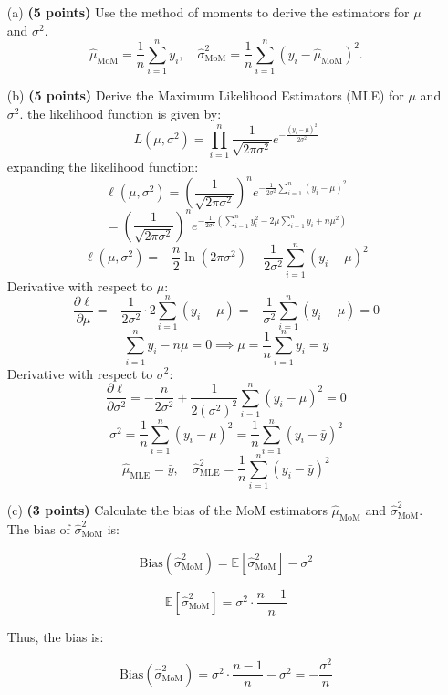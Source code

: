 \documentclass{article}
\begin{document}
\begin{enumerate}
    \item[(a)] \textbf{(5 points)} Use the method of moments to derive the estimators for \(\mu\) and \(\sigma^2\).
    \[
    \hat{\mu}_{\text{MoM}} = \frac{1}{n} \sum_{i=1}^{n} y_i, \quad \hat{\sigma}^2_{\text{MoM}} = \frac{1}{n} \sum_{i=1}^{n} (y_i - \hat{\mu}_{\text{MoM}})^2.
    \]
    
     \item[(b)] \textbf{(5 points)} Derive the Maximum Likelihood Estimators (MLE) for \(\mu\) and \(\sigma^2\).
    the likelihood function is given by:
    \[
    L(\mu, \sigma^2) = \prod_{i=1}^{n} \frac{1}{\sqrt{2\pi\sigma^2}} e^{-\frac{(y_i - \mu)^2}{2\sigma^2}}
    \]
    expanding the likelihood function:
    \[
    \ell(\mu, \sigma^2) = \left( \frac{1}{\sqrt{2\pi\sigma^2}} \right)^n e^{-\frac{1}{2\sigma^2} \sum_{i=1}^{n} (y_i - \mu)^2}
    \]
    \[
    = \left( \frac{1}{\sqrt{2\pi\sigma^2}} \right)^n e^{-\frac{1}{2\sigma^2} \left( \sum_{i=1}^{n} y_i^2 - 2\mu \sum_{i=1}^{n} y_i + n\mu^2 \right)}
    \]
    \[
    \ell(\mu, \sigma^2) = -\frac{n}{2} \ln(2\pi\sigma^2) - \frac{1}{2\sigma^2} \sum_{i=1}^n (y_i - \mu)^2
    \]
    Derivative with respect to \( \mu \):
    \[
    \frac{\partial \ell}{\partial \mu} = -\frac{1}{2\sigma^2} \cdot 2 \sum_{i=1}^n (y_i - \mu) = -\frac{1}{\sigma^2} \sum_{i=1}^n (y_i - \mu) = 0
    \]
    \[
    \sum_{i=1}^n y_i - n\mu = 0 \implies \mu = \frac{1}{n} \sum_{i=1}^n y_i = \bar{y}
    \]
    Derivative with respect to \( \sigma^2 \):
    \[
    \frac{\partial \ell}{\partial \sigma^2} = -\frac{n}{2\sigma^2} + \frac{1}{2(\sigma^2)^2} \sum_{i=1}^n (y_i - \mu)^2 = 0
    \]
    \[
    \sigma^2 = \frac{1}{n} \sum_{i=1}^n (y_i - \mu)^2 = \frac{1}{n} \sum_{i=1}^n (y_i - \bar{y})^2
    \]
    \[
    \hat{\mu}_{\text{MLE}} = \bar{y}, \quad \hat{\sigma}^2_{\text{MLE}} = \frac{1}{n} \sum_{i=1}^n (y_i - \bar{y})^2
    \]

     \item[(c)] \textbf{(3 points)} Calculate the bias of the MoM estimators \(\hat{\mu}_{\text{MoM}}\) and \(\hat{\sigma}^2_{\text{MoM}}\).
     The bias of \( \hat{\sigma}^2_{\text{MoM}} \) is:

\[
\text{Bias}(\hat{\sigma}^2_{\text{MoM}}) = \mathbb{E}[\hat{\sigma}^2_{\text{MoM}}] - \sigma^2
\]


\[
\mathbb{E}[\hat{\sigma}^2_{\text{MoM}}] = \sigma^2 \cdot \frac{n-1}{n}
\]

Thus, the bias is:

\[
\text{Bias}(\hat{\sigma}^2_{\text{MoM}}) = \sigma^2 \cdot \frac{n-1}{n} - \sigma^2 = -\frac{\sigma^2}{n}
\]


\end{enumerate}
\end{document}
